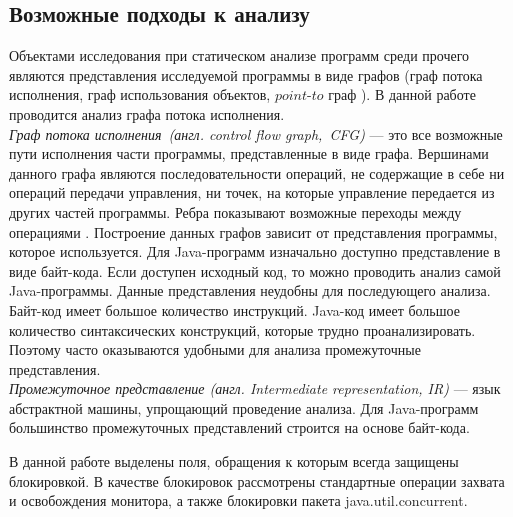 \subsection{Возможные подходы к анализу}
Объектами исследования при статическом анализе программ среди прочего являются представления исследуемой программы в виде графов (граф потока исполнения, граф использования объектов, $point$-$to$ граф \cite{Whaley:1999:CPE:320385.320400}). 
В данной работе проводится анализ графа потока исполнения. 
\\\emph{Граф потока исполнения\ (англ. control flow graph,\ CFG)} --- это все возможные пути исполнения части программы, представленные в виде графа. Вершинами данного графа являются последовательности операций, не содержащие в себе ни операций передачи управления, ни точек, на которые управление передается из других частей программы. Ребра показывают возможные переходы между операциями \cite{CFA}.
Построение данных графов зависит от представления программы, которое используется. Для Java-программ изначально 
доступно представление в виде байт-кода. Если доступен исходный код, то можно проводить анализ самой Java-программы.
Данные представления неудобны для последующего анализа. Байт-код имеет большое количество инструкций. Java-код имеет большое количество синтаксических конструкций, которые трудно проанализировать. Поэтому часто оказываются удобными для анализа промежуточные представления.
\\\emph{Промежуточное представление (англ. Intermediate representation, IR)} --- язык абстрактной машины, упрощающий проведение анализа. Для Java-программ большинство промежуточных представлений строится на основе байт-кода.

В данной работе выделены поля, обращения к которым всегда защищены блокировкой. В качестве блокировок рассмотрены стандартные операции захвата и освобождения монитора, а также блокировки пакета java.util.concurrent.
\FloatBarrier
